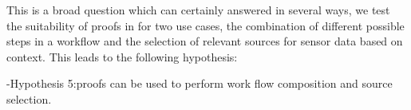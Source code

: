 This is a broad question which can certainly answered in several ways, we test the suitability of proofs in \nthreelogic for two use cases, the combination of different
possible steps in a workflow and the selection of relevant sources for sensor data based on context.  This leads to the following hypothesis:

\hyp{Hypothesis 5:}{\nthree proofs can be used to perform work flow composition and source selection.} 

% 
% 
% 


% 
% 



% 



